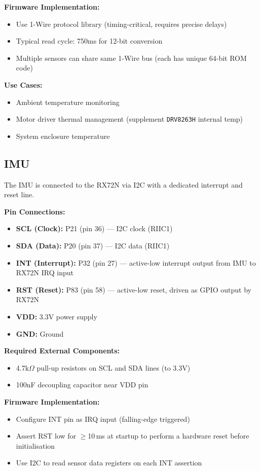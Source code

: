 \textbf{Firmware Implementation:}
\begin{itemize}
    \item Use 1-Wire protocol library (timing-critical, requires precise delays)
    \item Typical read cycle: 750ms for 12-bit conversion
    \item Multiple sensors can share same 1-Wire bus (each has unique 64-bit ROM code)
\end{itemize}

\textbf{Use Cases:}
\begin{itemize}
    \item Ambient temperature monitoring
    \item Motor driver thermal management (supplement \texttt{DRV8263H} internal temp)
    \item System enclosure temperature
\end{itemize}

\subsection{IMU}

The IMU is connected to the RX72N via I2C with a dedicated interrupt and reset line.

\textbf{Pin Connections:}
\begin{itemize}
    \item \textbf{SCL (Clock):} P21 (pin 36) --- I2C clock (RIIC1)
    \item \textbf{SDA (Data):} P20 (pin 37) --- I2C data (RIIC1)
    \item \textbf{INT (Interrupt):} P32 (pin 27) --- active-low interrupt output from IMU to RX72N IRQ input
    \item \textbf{RST (Reset):} P83 (pin 58) --- active-low reset, driven as GPIO output by RX72N
    \item \textbf{VDD:} 3.3V power supply
    \item \textbf{GND:} Ground
\end{itemize}

\textbf{Required External Components:}
\begin{itemize}
    \item 4.7k$\Omega$ pull-up resistors on SCL and SDA lines (to 3.3V)
    \item 100nF decoupling capacitor near VDD pin
\end{itemize}

\textbf{Firmware Implementation:}
\begin{itemize}
    \item Configure INT pin as IRQ input (falling-edge triggered)
    \item Assert RST low for $\geq$10\,ms at startup to perform a hardware reset before initialisation
    \item Use I2C to read sensor data registers on each INT assertion
\end{itemize}

